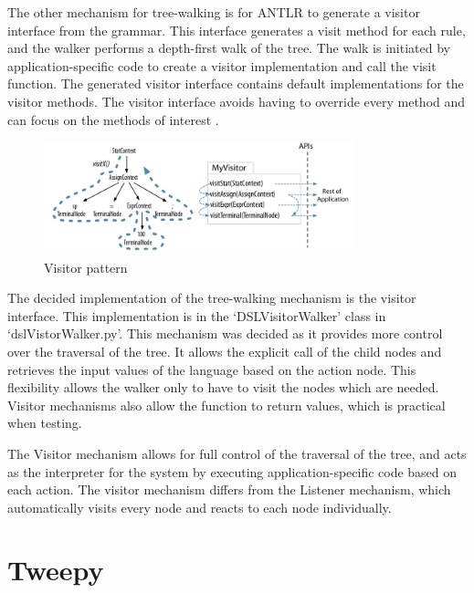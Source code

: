 The other mechanism for tree-walking is for ANTLR to generate a visitor interface from the grammar. This interface generates a visit method for each rule, and the walker performs a depth-first walk of the tree. The walk is initiated by application-specific code to create a visitor implementation and call the visit function. The generated visitor interface contains default implementations for the visitor methods. The visitor interface avoids having to override every method and can focus on the methods of interest \cite{parr2013definitive}. \newline \par

\begin{figure}[H]
  \centering
  \includegraphics[width=0.8\textwidth]{images/antlrvisitors.png}
  \caption{Visitor pattern \cite{parr2013definitive}}
\end{figure}

The decided implementation of the tree-walking mechanism is the visitor interface. This implementation is in the `DSLVisitorWalker' class in `dslVistorWalker.py'. This mechanism was decided as it provides more control over the traversal of the tree. It allows the explicit call of the child nodes and retrieves the input values of the language based on the action node. This flexibility allows the walker only to have to visit the nodes which are needed. Visitor mechanisms also allow the function to return values, which is practical when testing. \newline \par

The Visitor mechanism allows for full control of the traversal of the tree, and acts as the interpreter for the system by executing application-specific code based on each action. The visitor mechanism differs from the Listener mechanism, which automatically visits every node and reacts to each node individually.

\section{Tweepy}

